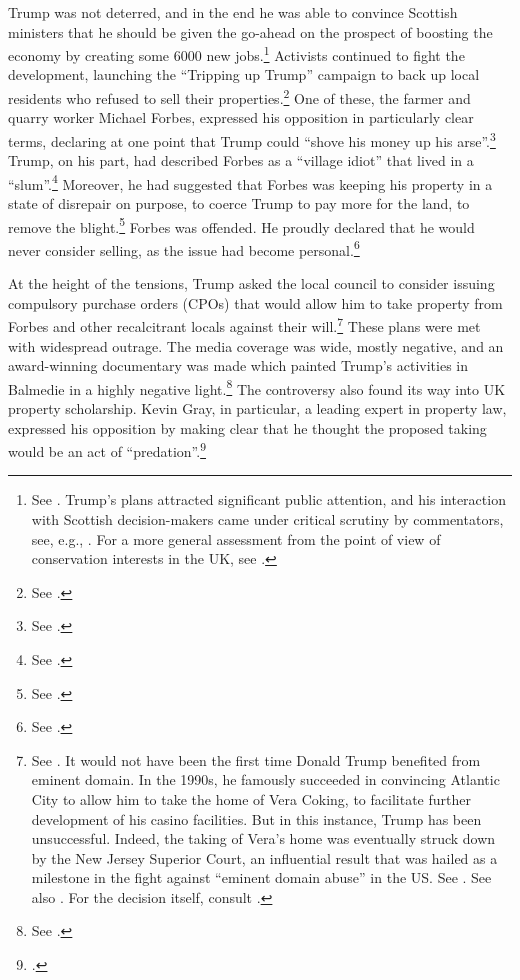 Trump was not deterred, and in the end he was able to convince Scottish ministers that he should be given the go-ahead on the prospect of boosting the economy by creating some 6000 new jobs.\footnote{See \cite{carrell08}. Trump's plans attracted significant public attention, and his interaction with Scottish decision-makers came under critical scrutiny by commentators, see, e.g., \cite{jenkins08}. For a more general assessment from the point of view of conservation interests in the UK, see \cite{koen13}.} Activists continued to fight the development, launching the ``Tripping up Trump'' campaign to back up local residents who refused to sell their properties.\footnote{See \cite{tripping15}.} One of these, the farmer and quarry worker Michael Forbes, expressed his opposition in particularly clear terms, declaring at one point that Trump could ``shove his money up his arse''.\footnote{See \cite{scotsman10}.} Trump, on his part, had described Forbes as a ``village idiot'' that lived in a ``slum''.\footnote{See \cite{bbc10}.} Moreover, he had suggested that Forbes was keeping his property in a state of disrepair on purpose, to coerce Trump to pay more for the land, to remove the blight.\footnote{See \cite{cnn07}.} Forbes was offended. He proudly declared that he would never consider selling, as the issue had become personal.\footnote{See \cite{ferguson12}.}

At the height of the tensions, Trump asked the local council to consider issuing compulsory purchase orders (CPOs) that would allow him to take property from Forbes and other recalcitrant locals against their will.\footnote{See \cite{macaskill09}. It would not have been the first time Donald Trump benefited from eminent domain. In the 1990s, he famously succeeded in convincing Atlantic City to allow him to take the home of Vera Coking, to facilitate further development of his casino facilities. But in this instance, Trump has been unsuccessful. Indeed, the taking of Vera's home was eventually struck down by the New Jersey Superior Court, an influential result that was hailed as a milestone in the fight against ``eminent domain abuse'' in the US. See \cite[297-301]{jones00}. See also \cite{gillespie08}. For the decision itself, consult \cite{banin98}.} These plans were met with widespread outrage. The media coverage was wide, mostly negative, and an award-winning documentary was made which painted Trump's activities in Balmedie in a highly negative light.\footnote{See \cite{baxter11}.} The controversy also found its way into UK property scholarship. Kevin Gray, in particular, a leading expert in property law, expressed his opposition by making clear that he thought the proposed taking would be an act of ``predation''.\footcite{gray11}

